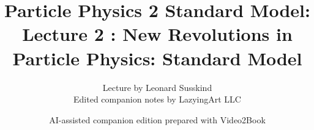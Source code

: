 \documentclass[11pt,oneside]{book}
\begin{document}
\frontmatter
\title{Particle Physics 2 Standard Model: Lecture 2 : New Revolutions in Particle Physics: Standard Model}
\author{Lecture by Leonard Susskind\\Edited companion notes by LazyingArt LLC}
\date{AI-assisted companion edition prepared with Video2Book}
\maketitle
\clearpage
\mainmatter

\end{document}
